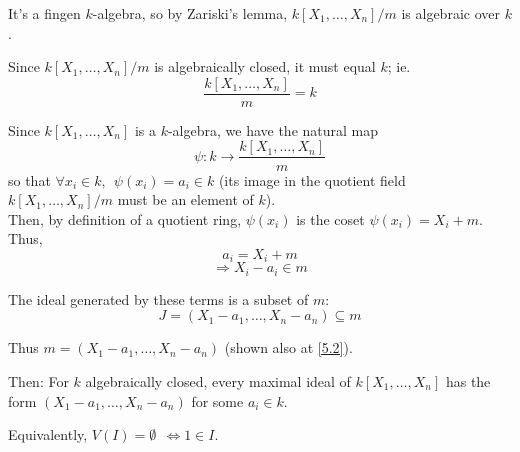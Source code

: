 \documentclass{article}
\theoremstyle{definition}
\begin{document}
It's a fingen $k$-algebra, so by Zariski's lemma, $k[X_1, \ldots, X_n]/m$ is algebraic over $k$.

Since $k[X_1, \ldots, X_n]/m$ is algebraically closed, it must equal $k$; ie.
$$\frac{k[X_1, \ldots, X_n]}{m}=k$$


Since $k[X_1, \ldots, X_n]$ is a $k$-algebra, we have the natural map
$$\psi: k \longrightarrow \frac{k[X_1, \ldots, X_n]}{m}$$
so that $\forall x_i \in k,~~\psi(x_i)=a_i \in k$ (its image in the quotient field $k[X_1, \ldots, X_n]/m$ must be an element of $k$).\\
Then, by definition of a quotient ring, $\psi(x_i)$ is the coset $\psi(x_i)=X_i +m$.
Thus,
$$a_i = X_i +m$$
$$\Longrightarrow X_i - a_i \in m$$


The ideal generated by these terms is a subset of $m$:
$$J=(X_1 -a_1, \ldots, X_n -a_n) \subseteq m$$

Thus $m=(X_1 - a_1, \ldots, X_n - a_n)$ (shown also at \ref{5.2}).

\vspace{0.4cm}
Then:
For $k$ algebraically closed, every maximal ideal of $k[X_1, \ldots, X_n]$ has the form 
$(X_1 - a_1, \ldots, X_n - a_n)$ for some $a_i \in k$.

Equivalently, $V(I) = \emptyset ~~\Longleftrightarrow  1 \in I$.

\vspace{0.4cm}
\end{document}
